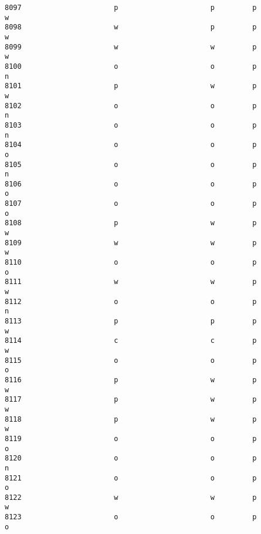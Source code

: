 \documentclass[11pt]{article}
\begin{document}
\begin{verbatim}
8097                      p                      p         p          w   
8098                      w                      p         p          w   
8099                      w                      w         p          w   
8100                      o                      o         p          n   
8101                      p                      w         p          w   
8102                      o                      o         p          n   
8103                      o                      o         p          n   
8104                      o                      o         p          o   
8105                      o                      o         p          n   
8106                      o                      o         p          o   
8107                      o                      o         p          o   
8108                      p                      w         p          w   
8109                      w                      w         p          w   
8110                      o                      o         p          o   
8111                      w                      w         p          w   
8112                      o                      o         p          n   
8113                      p                      p         p          w   
8114                      c                      c         p          w   
8115                      o                      o         p          o   
8116                      p                      w         p          w   
8117                      p                      w         p          w   
8118                      p                      w         p          w   
8119                      o                      o         p          o   
8120                      o                      o         p          n   
8121                      o                      o         p          o   
8122                      w                      w         p          w   
8123                      o                      o         p          o   


\end{verbatim}
\end{document}
